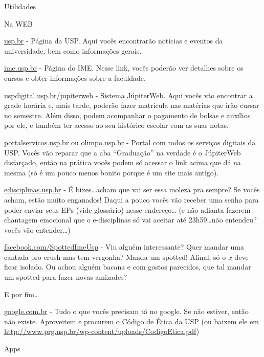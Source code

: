 \begin{secao}{Utilidades}

\begin{subsecao}{Na WEB}

\url{usp.br} - Página da USP. Aqui vocês encontrarão notícias e eventos da
universidade, bem como informações gerais.

\url{ime.usp.br} - Página do IME. Nesse link, vocês poderão ver detalhes sobre
os cursos e obter informações sobre a faculdade.

\url{uspdigital.usp.br/jupiterweb} - Sistema JúpiterWeb. Aqui vocês vão
encontrar a grade horária e, mais tarde, poderão fazer matrícula nas matérias
que irão cursar no semestre. Além disso, podem acompanhar o pagamento de
bolsas e auxílios por ele, e também ter acesso ao seu histórico escolar com
as suas notas.

\url{portalservicos.usp.br} ou \url{olimpo.usp.br} - Portal com todos os
serviços digitais da USP. Vocês vão reparar que a aba ``Graduação'' na verdade
é o JúpiterWeb disfarçado, então na prática vocês podem só acessar o link acima
que dá na mesma (só é um pouco menos bonito porque é um site mais antigo).

\url{edisciplinas.usp.br} - É bixes\dots acham que vai ser essa moleza pra
sempre? Se vocês acham, estão muito enganados! Daqui a pouco vocês vão receber
uma senha para poder enviar seus EPs (vide glossário) nesse endereço\dots
(e não adianta fazerem chantagem emocional que o e-disciplinas só vai aceitar
até 23h59\dots não entendeu? vocês vão entender\dots)

\url{facebook.com/SpottedImeUsp} - Viu alguém interessante? Quer mandar uma
cantada pro crush mas tem vergonha? Manda um spotted! Afinal, só o $x$ deve
ficar isolado. Ou achou alguém bacana e com gostos parecidos, que tal mandar um
spotted para fazer novas amizades?


E por fim\dots

\url{google.com.br} - Tudo o que vocês precisam tá no google. Se não
estiver, então não existe. Aproveitem e procurem o Código de Ética da USP (ou
baixem ele em \url{http://www.prg.usp.br/wp-content/uploads/CodigoEtica.pdf})

\end{subsecao}

\begin{subsecao}{Apps}
	

\end{subsecao}
\end{secao}
